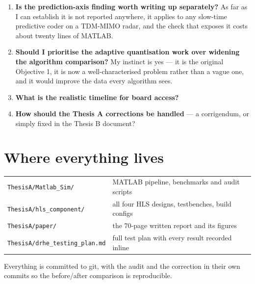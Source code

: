 \documentclass[11pt,a4paper]{article}
\begin{document}
\begin{enumerate}
\item \textbf{Is the prediction-axis finding worth writing up separately?} As
far as I can establish it is not reported anywhere, it applies to any
slow-time predictive coder on a TDM-MIMO radar, and the check that exposes it
costs about twenty lines of MATLAB.

\item \textbf{Should I prioritise the adaptive quantisation work over widening
the algorithm comparison?} My instinct is yes --- it is the original Objective 1,
it is now a well-characterised problem rather than a vague one, and it would
improve the data every algorithm sees.

\item \textbf{What is the realistic timeline for board access?}

\item \textbf{How should the Thesis A corrections be handled} --- a corrigendum,
or simply fixed in the Thesis B document?
\end{enumerate}

\section*{Where everything lives}

\begin{table}[h]
\centering
\small
\begin{tabular}{@{}ll@{}}
\toprule
\texttt{ThesisA/Matlab\_Sim/} & MATLAB pipeline, benchmarks and audit scripts\\
\texttt{ThesisA/hls\_component/} & all four HLS designs, testbenches, build configs\\
\texttt{ThesisA/paper/} & the 70-page written report and its figures\\
\texttt{ThesisA/drhe\_testing\_plan.md} & full test plan with every result recorded inline\\
\bottomrule
\end{tabular}
\end{table}

\noindent
Everything is committed to git, with the audit and the correction in their own
commits so the before/after comparison is reproducible.
\end{document}
